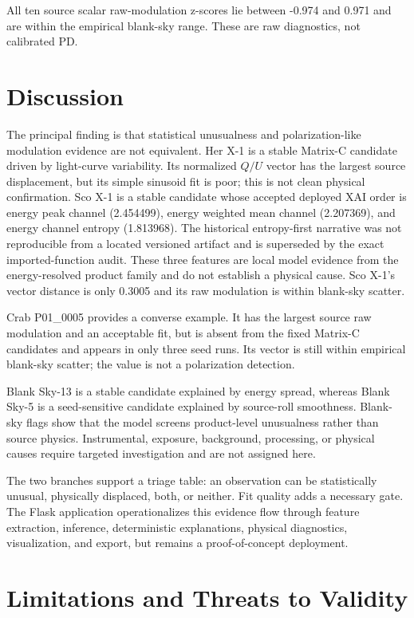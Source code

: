 \documentclass[conference]{IEEEtran}
\begin{document}
All ten source scalar raw-modulation z-scores lie between -0.974 and 0.971 and are within the empirical blank-sky range. These are raw diagnostics, not calibrated PD.

\section{Discussion}

The principal finding is that statistical unusualness and polarization-like modulation evidence are not equivalent. Her X-1 is a stable Matrix-C candidate driven by light-curve variability. Its normalized \(Q/U\) vector has the largest source displacement, but its simple sinusoid fit is poor; this is not clean physical confirmation. Sco X-1 is a stable candidate whose accepted deployed XAI order is energy peak channel (2.454499), energy weighted mean channel (2.207369), and energy channel entropy (1.813968). The historical entropy-first narrative was not reproducible from a located versioned artifact and is superseded by the exact imported-function audit. These three features are local model evidence from the energy-resolved product family and do not establish a physical cause. Sco X-1's vector distance is only 0.3005 and its raw modulation is within blank-sky scatter.

Crab P01\_0005 provides a converse example. It has the largest source raw modulation and an acceptable fit, but is absent from the fixed Matrix-C candidates and appears in only three seed runs. Its vector is still within empirical blank-sky scatter; the value is not a polarization detection.

Blank Sky-13 is a stable candidate explained by energy spread, whereas Blank Sky-5 is a seed-sensitive candidate explained by source-roll smoothness. Blank-sky flags show that the model screens product-level unusualness rather than source physics. Instrumental, exposure, background, processing, or physical causes require targeted investigation and are not assigned here.

The two branches support a triage table: an observation can be statistically unusual, physically displaced, both, or neither. Fit quality adds a necessary gate. The Flask application operationalizes this evidence flow through feature extraction, inference, deterministic explanations, physical diagnostics, visualization, and export, but remains a proof-of-concept deployment.

\section{Limitations and Threats to Validity}
\end{document}

